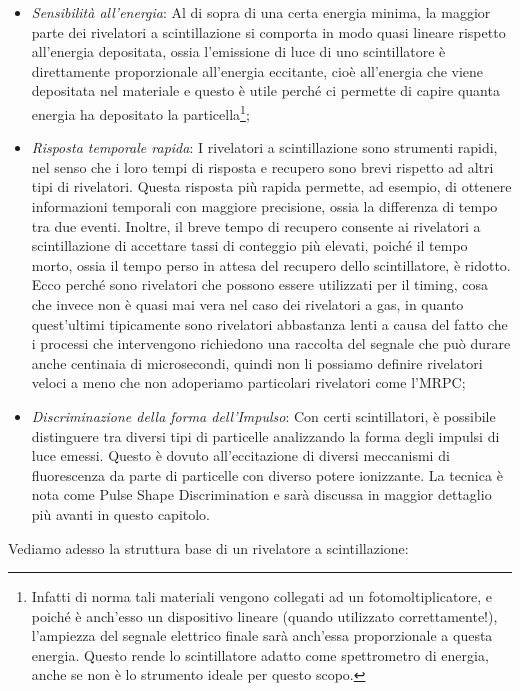 \begin{itemize}[leftmargin=0.5cm]
   \item \textit{Sensibilità all'energia}: Al di sopra di una certa energia minima, la maggior parte dei rivelatori a scintillazione si comporta in modo quasi lineare rispetto all'energia depositata, ossia l'emissione di luce di uno scintillatore è direttamente proporzionale all'energia eccitante, cioè all'energia che viene depositata nel materiale e questo è utile perché ci permette di capire quanta energia ha depositato la particella\footnote{Infatti di norma tali materiali vengono collegati ad un fotomoltiplicatore, e poiché è anch'esso un dispositivo lineare (quando utilizzato correttamente!), l'ampiezza del segnale elettrico finale sarà anch'essa proporzionale a questa energia. Questo rende lo scintillatore adatto come spettrometro di energia, anche se non è lo strumento ideale per questo scopo.};
   \item \textit{Risposta temporale rapida}: I rivelatori a scintillazione sono strumenti rapidi, nel senso che i loro tempi di risposta e recupero sono brevi rispetto ad altri tipi di rivelatori. Questa risposta più rapida permette, ad esempio, di ottenere informazioni temporali con maggiore precisione, ossia la differenza di tempo tra due eventi. Inoltre, il breve tempo di recupero consente ai rivelatori a scintillazione di accettare tassi di conteggio più elevati, poiché il tempo morto, ossia il tempo perso in attesa del recupero dello scintillatore, è ridotto. Ecco perché sono rivelatori che possono essere utilizzati per il timing, cosa che invece non è quasi mai vera nel caso dei rivelatori a gas, in quanto quest'ultimi tipicamente sono rivelatori abbastanza lenti a causa del fatto che i processi che intervengono richiedono una raccolta del segnale che può durare anche centinaia di microsecondi, quindi non li possiamo definire rivelatori veloci a meno che non adoperiamo particolari rivelatori come l'MRPC;
   \item \textit{Discriminazione della forma dell'Impulso}: Con certi scintillatori, è possibile distinguere tra diversi tipi di particelle analizzando la forma degli impulsi di luce emessi. Questo è dovuto all'eccitazione di diversi meccanismi di fluorescenza da parte di particelle con diverso potere ionizzante. La tecnica è nota come Pulse Shape Discrimination e sarà discussa in maggior dettaglio più avanti in questo capitolo.
\end{itemize}

Vediamo adesso la struttura base di un rivelatore a scintillazione:

